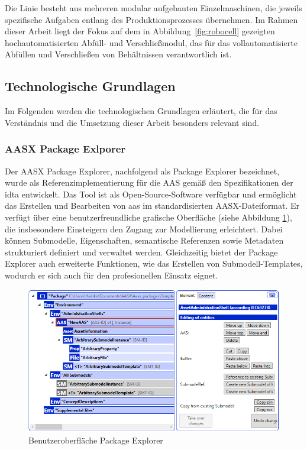 Die Linie besteht aus mehreren modular aufgebauten Einzelmaschinen, die jeweils spezifische Aufgaben entlang des Produktionsprozesses übernehmen. 
Im Rahmen dieser Arbeit liegt der Fokus auf dem in Abbildung~\ref{fig:robocell} gezeigten hochautomatisierten Abfüll- und Verschließmodul, das für das vollautomatisierte Abfüllen und Verschließen von Behältnissen verantwortlich ist.

\newpage
\subsection{Technologische Grundlagen}
Im Folgenden werden die technologischen Grundlagen erläutert, die für das Verständnis und die Umsetzung dieser Arbeit besonders relevant sind.
\subsubsection{AASX Package Exlporer}
Der AASX Package Explorer, nachfolgend als Package Explorer bezeichnet, wurde als Referenzimplementierung für die AAS gemäß den Spezifikationen der \acs{idta} entwickelt.
Das Tool ist als Open-Source-Software \cite{AASXPackageExplorer} verfügbar und ermöglicht das Erstellen und Bearbeiten von \acs{aas} im standardisierten AASX-Dateiformat.
Er verfügt über eine benutzerfreundliche grafische Oberfläche (siehe Abbildung \ref{fig:AASXPackageExplorer}), die insbesondere Einsteigern den Zugang zur Modellierung erleichtert.
Dabei können Submodelle, Eigenschaften, semantische Referenzen sowie Metadaten strukturiert definiert und verwaltet werden.
Gleichzeitig bietet der Package Explorer auch erweiterte Funktionen, wie das Erstellen von Submodell-Templates, wodurch er sich auch für den profesionellen Einsatz eignet.

\begin{figure}[htbp]
    \centering
    \includegraphics[scale=0.765]{Bilder/ModellierungAAS/Final/Grundlagen_PE.PNG}
    \caption{Benutzeroberfläche Package Explorer}
    \label{fig:AASXPackageExplorer}
\end{figure}

